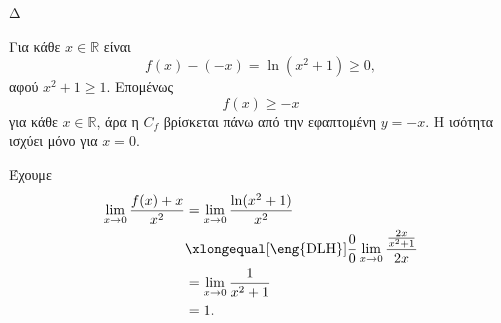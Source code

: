 \begin{thema}{Δ}
\begin{erwthma}
Για κάθε $x\in\mathbb{R}$ είναι
\[
f(x)-(-x)=\ln(x^2+1)\geq0,
\]
αφού $x^2+1\geq1$. Επομένως
\[
{f(x)\geq-x}
\]
για κάθε $x\in\mathbb{R}$, άρα η $C_f$ βρίσκεται πάνω από την εφαπτομένη $y=-x$. Η ισότητα ισχύει μόνο για $x=0$.

\item Έχουμε
\begin{align*}
\lim_{x\to0}\frac{f(x)+x}{x^2}
&=\lim_{x\to0}\frac{\ln(x^2+1)}{x^2}\\
&\xlongequal[\text{\eng{DLH}}]{\frac{0}{0}}
\lim_{x\to0}\frac{\frac{2x}{x^2+1}}{2x}\\
&=\lim_{x\to0}\frac{1}{x^2+1}\\
&={1}.
\end{align*}
\end{erwthma}
\end{thema}
